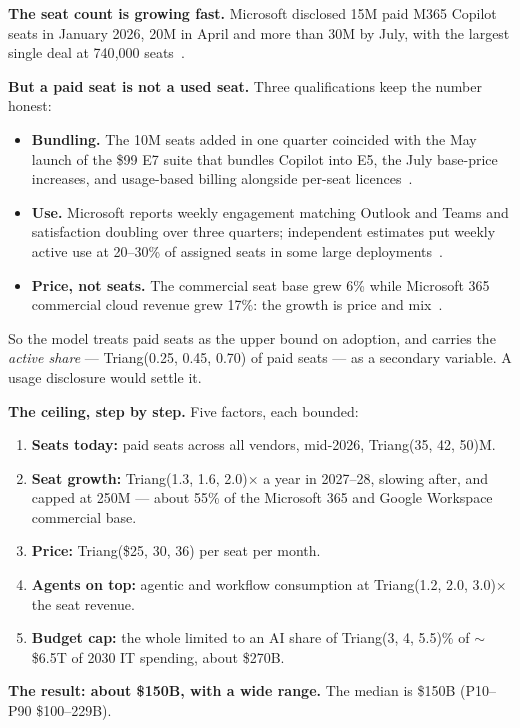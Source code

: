 \documentclass[11pt,letterpaper]{article}
\newcommand{\lead}[1]{{\color{leadwarm}\sffamily\bfseries #1}}
\begin{document}
\lead{The seat count is growing fast.} Microsoft disclosed 15M paid M365 Copilot seats in January 2026, 20M in April and more than 30M by July, with the largest single deal at 740{,}000 seats~\cite{ref:msft_copilot_seats,ref:q2_scorecard}.

\lead{But a paid seat is not a used seat.} Three qualifications keep the number honest:
\begin{itemize}
\item \textbf{Bundling.} The 10M seats added in one quarter coincided with the May launch of the \$99 E7 suite that bundles Copilot into E5, the July base-price increases, and usage-based billing alongside per-seat licences~\cite{ref:ai2_copilot,ref:windowsforum_copilot}.
\item \textbf{Use.} Microsoft reports weekly engagement matching Outlook and Teams and satisfaction doubling over three quarters; independent estimates put weekly active use at 20--30\% of assigned seats in some large deployments~\cite{ref:ai2_copilot}.
\item \textbf{Price, not seats.} The commercial seat base grew 6\% while Microsoft 365 commercial cloud revenue grew 17\%: the growth is price and mix~\cite{ref:msft_8k_fy27,ref:fool_copilot}.
\end{itemize}
So the model treats paid seats as the upper bound on adoption, and carries the \emph{active share} --- Triang(0.25, 0.45, 0.70) of paid seats --- as a secondary variable. A usage disclosure would settle it.

\lead{The ceiling, step by step.} Five factors, each bounded:
\begin{enumerate}
\item \textbf{Seats today:} paid seats across all vendors, mid-2026, Triang(35, 42, 50)M.
\item \textbf{Seat growth:} Triang(1.3, 1.6, 2.0)$\times$ a year in 2027--28, slowing after, and capped at 250M --- about 55\% of the Microsoft 365 and Google Workspace commercial base.
\item \textbf{Price:} Triang(\$25, 30, 36) per seat per month.
\item \textbf{Agents on top:} agentic and workflow consumption at Triang(1.2, 2.0, 3.0)$\times$ the seat revenue.
\item \textbf{Budget cap:} the whole limited to an AI share of Triang(3, 4, 5.5)\% of $\sim$\$6.5T of 2030 IT spending, about \$270B.
\end{enumerate}

\lead{The result: about \$150B, with a wide range.} The median is \$150B (P10--P90 \$100--229B).
\end{document}
